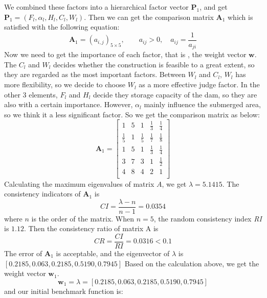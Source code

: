 \documentclass{mcmthesis}
\begin{document}
We combined these factors into a hierarchical factor vector $\textbf{P}_1$, and get $\textbf{P}_1 = (F_{l}, \alpha_{l}, H_{l}, C_{l}, W_{l})$. Then we can get the comparison matrix $\textbf{A}_1$ which is satisfied with the following equation:
\begin{equation}
\textbf{A}_1 = (a_{i,j})_{5\times5},\qquad a_{ij} > 0, \quad a_{ij} = \frac{1}{a_{ji}}
\end{equation}
Now we need to get the importance of each factor, that is , the weight vector $\textbf{w}$. The $C_{l}$ and $W_{l}$ decides whether the construction is feasible to a great extent, so they are regarded as the most important factors. Between $W_{l}$ and $C_{l}$, $W_{l}$ has more flexibility, so we decide to choose $W_{l}$ as a more effective judge factor. In the other 3 elements, $F_{l}$ and $H_{l}$ decide they storage capacity of the dam, so they are also with a certain importance. However, $\alpha_{l}$ mainly influence the submerged area, so we think it a less significant factor. So we get the comparison matrix as below:
\[\textbf{A}_1 = 
\left[
\begin{matrix}
1 & 5 & 1 & \frac{1}{3} & \frac{1}{4} \\
\frac{1}{5}  & 1 & \frac{1}{5} & \frac{1}{7} & \frac{1}{8} \\ 
1 & 5 & 1 & \frac{1}{3} & \frac{1}{4} \\
3 & 7 & 3 & 1 & \frac{1}{2} \\
4 & 8 & 4 & 2 & 1 \\
\end{matrix}
\right]
\]
Calculating the maximum eigenvalues of matrix $A$, we get $\lambda = 5.1415$. The consistency indicators of $\textbf{A}_1$ is \[\mathit{CI} = \frac{\lambda - n}{n - 1} = 0.0354\]
where $n$ is the order of the matrix. When $n = 5$, the random consistency index \textit{RI} is $1.12$. Then the consistency ratio of matrix A is \[\mathit{CR} = \frac{\mathit{CI}}{\mathit{RI}} = 0.0316 < 0.1 \]
The error of $\textbf{A}_1$ is acceptable, and the eigenvector of $\lambda$ is $\left[0.2185, 0.063, 0.2185, 0.5190, 0.7945\right]$
Based on the calculation above, we get the weight vector $\textbf{w}_{1}$.
\begin{equation}
\textbf{w}_{1} = \lambda = \left[0.2185, 0.063, 0.2185, 0.5190, 0.7945\right]
\end{equation}
and our initial benchmark function is:
\end{document}
